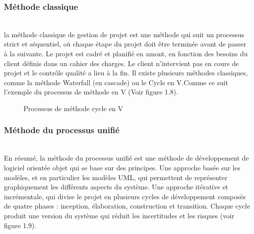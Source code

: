 \subsubsection{\Large Méthode   classique}
\texttt{}\\[0.1cm]
\textsf{\selectfont{}
 la méthode classique de gestion de projet est une méthode qui suit un processus strict et séquentiel, où chaque étape du projet doit être terminée avant de passer à la suivante. Le projet est cadré et planifié en amont, en fonction des besoins du client définis dans un cahier des charges. Le client n’intervient pas en cours de projet et le contrôle qualité a lieu à la fin. Il existe plusieurs méthodes classiques, comme la méthode Waterfall (en cascade) ou le Cycle en V.Comme ce suit l'exemple du processus de méthode en V (Voir figure 1.8)}.\\[0.1cm]
\texttt{}
\begin{figure}[H]
    \begin{center}
    
    \end{center}
    \caption{Processus de méthode cycle en V}
\end{figure}
\subsubsection{\Large Méthode  du processus unifié }
\texttt{}\\[0.2cm]
\textsf{\selectfont{}
En résumé, la méthode du processus unifié est une méthode de développement de logiciel orientée objet qui se base sur des principes.
Une approche basée sur les modèles, et en particulier les modèles UML, qui permettent de représenter graphiquement les différents aspects du système.
Une approche itérative et incrémentale, qui divise le projet en plusieurs cycles de développement composés de quatre phases : inception, élaboration, construction et transition. Chaque cycle produit une version du système qui réduit les incertitudes et les risques (voir figure 1.9). 
}

